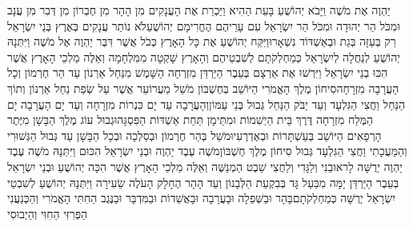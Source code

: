 \documentclass[../main/main.tex]{subfiles}
\begin{document}
\begin{multicols*}{\ncols}
יַהְוֶה אֶת מֹשֶׁה \ClosedSection{}וַיָּבֹא יְהוֹשֻׁעַ בָּעֵת הַהִיא וַיַּכְרֵת אֶת הָעֲנָקִים מִן הָהָר מִן חֶבְרוֹן מִן דְּבִר מִן עֲנָב וּמִכֹּל הַר יְהוּדָה וּמִכֹּל הַר יִשְׂרָאֵל עִם עָרֵיהֶם הֶחֱרִימָם יְהוֹשֻׁעַ\PreVerseSpace{}לֹא נוֹתַר עֲנָקִים בְּאֶרֶץ בְּנֵי יִשְׂרָאֵל רַק בְּעַזָּה בְּגַת וּבְאַשְׁדּוֹד נִשְׁאָרוּ\PreVerseSpace{}וַיִּקַּח יְהוֹשֻׁעַ אֶת כָּל הָאָרֶץ כְּכֹל אֲשֶׁר דִּבֶּר יַהְוֶה אֶל מֹשֶׁה וַיִּתְּנָהּ יְהוֹשֻׁעַ לְנַחֲלָה לְיִשְׂרָאֵל כְּמַחְלְקֹתָם לְשִׁבְטֵיהֶם וְהָאָרֶץ שָׁקְטָה מִמִּלְחָמָה \ClosedSection{}וְאֵלֶּה מַלְכֵי הָאָרֶץ אֲשֶׁר הִכּוּ בְנֵי יִשְׂרָאֵל וַיִּרְשׁוּ אֶת אַרְצָם בְּעֵבֶר הַיַּרְדֵּן מִזְרְחָה הַשָּׁמֶשׁ מִנַּחַל אַרְנוֹן עַד הַר חֶרְמוֹן וְכָל הָעֲרָבָה מִזְרָחָה\PreVerseSpace{}סִיחוֹן מֶלֶךְ הָאֱמֹרִי הַיּוֹשֵׁב בְּחֶשְׁבּוֹן מֹשֵׁל מֵעֲרוֹעֵר אֲשֶׁר עַל שְׂפַת נַחַל אַרְנוֹן וְתוֹךְ הַנַּחַל וַחֲצִי הַגִּלְעָד וְעַד יַבֹּק הַנַּחַל גְּבוּל בְּנֵי עַמּוֹן\PreVerseSpace{}וְהָעֲרָבָה עַד יָם כִּנְרוֹת מִזְרָחָה וְעַד יָם הָעֲרָבָה יָם הַמֶּלַח מִזְרָחָה דֶּרֶךְ בֵּית הַיְשִׁמוֹת וּמִתֵּימָן תַּחַת אַשְׁדּוֹת הַפִּסְגָּה\PreVerseSpace{}וּגְבוּל עוֹג מֶלֶךְ הַבָּשָׁן מִיֶּתֶר הָרְפָאִים הַיּוֹשֵׁב בְּעַשְׁתָּרוֹת וּבְאֶדְרֶעִי\PreVerseSpace{}וּמֹשֵׁל בְּהַר חֶרְמוֹן וּבְסַלְכָה וּבְכָל הַבָּשָׁן עַד גְּבוּל הַגְּשׁוּרִי וְהַמַּעֲכָתִי וַחֲצִי הַגִּלְעָד גְּבוּל סִיחוֹן מֶלֶךְ חֶשְׁבּוֹן\PreVerseSpace{}מֹשֶׁה עֶבֶד יַהְוֶה וּבְנֵי יִשְׂרָאֵל הִכּוּם וַיִּתְּנָהּ מֹשֶׁה עֶבֶד יַהְוֶה יְרֻשָּׁה לָראוּבֵנִי וְלַגָּדִי וְלַחֲצִי שֵׁבֶט הַמְנַשֶּׁה \ClosedSection{}וְאֵלֶּה מַלְכֵי הָאָרֶץ אֲשֶׁר הִכָּה יְהוֹשֻׁעַ וּבְנֵי יִשְׂרָאֵל בְּעֵבֶר הַיַּרְדֵּן יָמָּה מִבַּעַל גָּד בְּבִקְעַת הַלְּבָנוֹן וְעַד הָהָר הֶחָלָק הָעֹלֶה שֵׂעִירָה וַיִּתְּנָהּ יְהוֹשֻׁעַ לְשִׁבְטֵי יִשְׂרָאֵל יְרֻשָּׁה כְּמַחְלְקֹתָם\PreVerseSpace{}בָּהָר וּבַשְּׁפֵלָה וּבָעֲרָבָה וּבָאֲשֵׁדוֹת וּבַמִּדְבָּר וּבַנֶּגֶב הַחִתִּי הָאֱמֹרִי וְהַכְּנַעֲנִי הַפְּרִזִּי הַחִוִּי וְהַיְבוּסִי\OpenSection{}\par

\end{multicols*}
\end{document}
